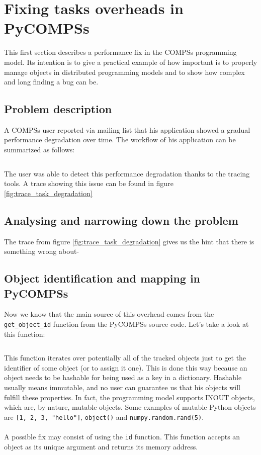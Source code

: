 \newpage
\section{Fixing tasks overheads in PyCOMPSs}
\label{sec:task_overhead}
This first section describes a performance fix in the COMPSs programming model. Its intention is to give a practical example of how important is to properly manage objects in distributed programming models and to show how complex and long finding a bug can be.

\subsection{Problem description}
A COMPSs user reported via mailing list that his application showed a gradual performance degradation over time. The workflow of his application can be summarized as follows:

\inputminted{python}{applications/TASK_OVERHEAD/main.py}

The user was able to detect this performance degradation thanks to the tracing tools. A trace showing this issue can be found in figure \ref{fig:trace_task_degradation}


\subsection{Analysing and narrowing down the problem}
The trace from figure \ref{fig:trace_task_degradation} gives us the hint that there is something wrong about-

\subsection{Object identification and mapping in PyCOMPSs}
Now we know that the main source of this overhead comes from the \verb|get_object_id| function from the PyCOMPSs source code. Let's take a look at this function:

\inputminted{python}{snippets/get_object_id_old.py}

This function iterates over potentially all of the tracked objects just to get the identifier of some object (or to assign it one). This is done this way because an object needs to be hashable for being used as a key in a dictionary. Hashable usually means immutable, and no user can guarantee us that his objects will fulfill these properties. In fact, the programming model supports INOUT objects, which are, by nature, mutable objects. Some examples of mutable Python objects are \verb|[1, 2, 3, "hello"]|, \verb|object()| and \verb|numpy.random.rand(5)|.\\
\\
A possible fix may consist of using the \verb|id| function. This function accepts an object as its unique argument and returns its memory address.


